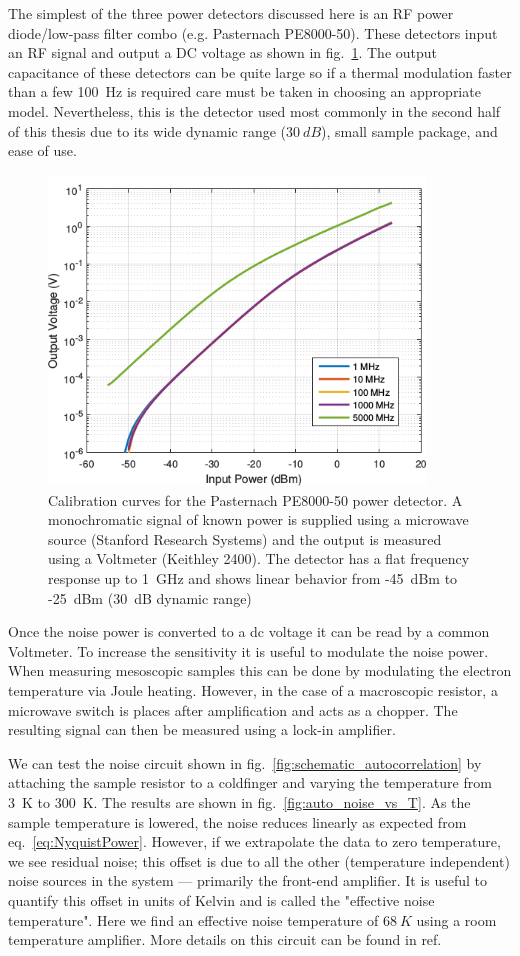 The simplest of the three power detectors discussed here is an RF power diode/low-pass filter combo (e.g. Pasternach PE8000-50). These detectors input an RF signal and output a DC voltage as shown in fig.~\ref{fig:PE8000}. The output capacitance of these detectors can be quite large so if a thermal modulation faster than a few 100~Hz is required care must be taken in choosing an appropriate model. Nevertheless, this is the detector used most commonly in the second half of this thesis due to its wide dynamic range ($30~dB$), small sample package, and ease of use.

\begin{figure}
\centering
\includegraphics[width = 100mm]{figures/Johnson_noise_thermometry/PE8000-50.png}
\caption{Calibration curves for the Pasternach PE8000-50 power detector. A monochromatic signal of known power is supplied using a microwave source (Stanford Research Systems) and the output is measured using a Voltmeter (Keithley 2400). The detector has a flat frequency response up to 1~GHz and shows linear behavior from -45~dBm to -25~dBm (30~dB dynamic range)}
\label{fig:PE8000}
\end{figure}

Once the noise power is converted to a dc voltage it can be read by a common Voltmeter. To increase the sensitivity it is useful to modulate the noise power. When measuring mesoscopic samples this can be done by modulating the electron temperature via Joule heating. However, in the case of a macroscopic resistor, a microwave switch is places after amplification and acts as a chopper. The resulting signal can then be measured using a lock-in amplifier.

We can test the noise circuit shown in fig.~\ref{fig:schematic_autocorrelation} by attaching the sample resistor to a coldfinger and varying the temperature from 3~K to 300~K. The results are shown in fig.~\ref{fig:auto_noise_vs_T}. As the sample temperature is lowered, the noise reduces linearly as expected from eq.~\ref{eq:NyquistPower}. However, if we extrapolate the data to zero temperature, we see residual noise; this offset is due to all the other (temperature independent) noise sources in the system --- primarily the front-end amplifier. It is useful to quantify this offset in units of Kelvin and is called the "effective noise temperature". Here we find an effective noise temperature of $68~K$ using a room temperature amplifier.
More details on this circuit can be found in ref.~\citep{crossno_development_2015}

